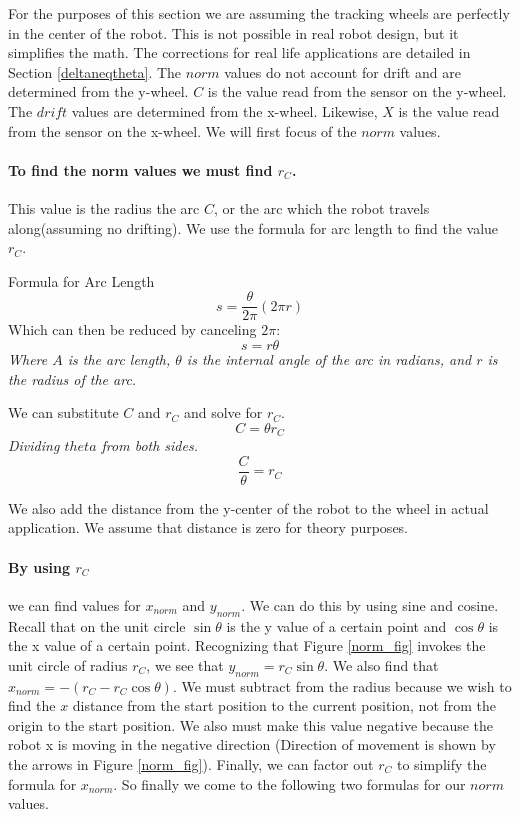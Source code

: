 \documentclass[12pt]{report}
\begin{document}
For the purposes of this section we are assuming the tracking wheels are perfectly in the center of the robot.
This is not possible in real robot design, but it simplifies the math. The corrections for real life applications are detailed in Section \ref{deltaneqtheta}.
The $norm$ values do not account for drift and are determined from the y-wheel. $C$ is the value read from the sensor on the y-wheel.
The $drift$ values are determined from the x-wheel.
Likewise, $X$ is the value read from the sensor on the x-wheel.
We will first focus of the $norm$ values.
\paragraph{To find the norm values we must find $r_C$.} This value is the radius the arc $C$, or the arc which the robot travels along(assuming no drifting).
We use the formula for arc length to find the value $r_C$.

\centering
Formula for Arc Length
$$ s = \frac{\theta}{2\pi} (2\pi r) $$
Which can then be reduced by canceling $2\pi$:
$$ s = r\theta $$
\textit{Where $A$ is the arc length, $\theta$ is the internal angle of the arc in radians, and $r$ is the radius of the arc.}

We can substitute $C$ and $r_C$ and solve for $r_C$.
$$ C = \theta r_C $$
\textit{Dividing $theta$ from both sides.}
$$ \frac{C}{\theta} = r_C $$

\raggedright
We also add the distance from the y-center of the robot to the wheel in actual application.
We assume that distance is zero for theory purposes.

\paragraph{By using $r_C$} we can find values for $x_{norm}$ and $y_{norm}$.
We can do this by using sine and cosine.
Recall that on the unit circle $\sin\theta$ is the y value of a certain point and $\cos\theta$ is the x value of a certain point.
Recognizing that Figure \ref{norm_fig} invokes the unit circle of radius $r_C$, we see that $y_{norm} = r_C \sin\theta$.
We also find that $x_{norm} = -(r_C - r_C \cos\theta)$.
We must subtract from the radius because we wish to find the $x$ distance from the start position to the current position, not from the origin to the start position.
We also must make this value negative because the robot x is moving in the negative direction (Direction of movement is shown by the arrows in Figure \ref{norm_fig}).
Finally, we can factor out $r_C$ to simplify the formula for $x_{norm}$.
So finally we come to the following two formulas for our $norm$ values.
\end{document}
